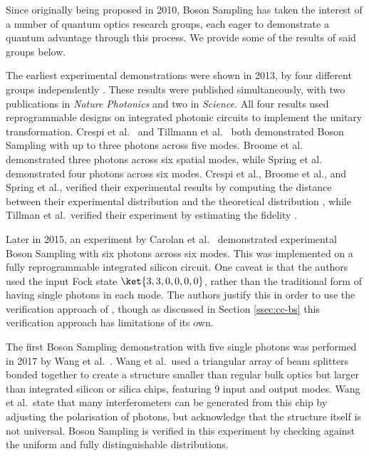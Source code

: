Since originally being proposed in 2010, Boson Sampling has taken the interest of a number of quantum optics research groups, each eager to demonstrate a quantum advantage through this process. We provide some of the results of said groups below.

The earliest experimental demonstrations were shown in 2013, by four different groups independently \cite{broome2013, spring2013, tillmann2013, crespi2013}. These results were published simultaneously, with two publications in \emph{Nature Photonics} and two in \emph{Science}. All four results used reprogrammable designs on integrated photonic circuits to implement the unitary transformation. Crespi et al.~\cite{crespi2013} and Tillmann et al.~\cite{tillmann2013} both demonstrated Boson Sampling with up to three photons across five modes. Broome et al.~\cite{broome2013} demonstrated three photons across six spatial modes, while Spring et al.~\cite{spring2013} demonstrated four photons across six modes. Crespi et al., Broome et al., and Spring et al., verified their experimental results by computing the distance between their experimental distribution and the theoretical distribution \cite{spring2013, tillmann2013, crespi2013}, while Tillman et al.\ verified their experiment by estimating the fidelity \cite{tillmann2013}.

Later in 2015, an experiment by Carolan et al.~\cite{carolan2015} demonstrated experimental Boson Sampling with six photons across six modes. This was implemented on a fully reprogrammable integrated silicon circuit. One caveat is that the authors used the input Fock state $\ket{3,3,0,0,0,0}$, rather than the traditional form of having single photons in each mode. The authors justify this in order to use the verification approach of \cite{carolan2014}, though as discussed in Section \ref{ssec:cc-bs} this verification approach has limitations of its own.

The first Boson Sampling demonstration with five single photons was performed in 2017 by Wang et al.~\cite{wang2017}. Wang et al.\ used a triangular array of beam splitters bonded together to create a structure smaller than regular bulk optics but larger than integrated silicon or silica chips, featuring 9 input and output modes. Wang et al.\ state that many interferometers can be generated from this chip by adjusting the polarisation of photons, but acknowledge that the structure itself is not universal. Boson Sampling is verified in this experiment by checking against the uniform and fully distinguishable distributions.

